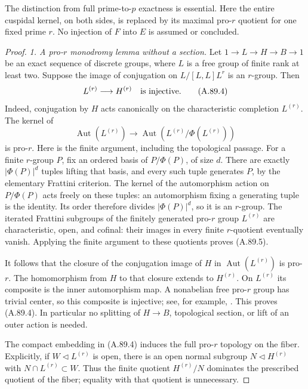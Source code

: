 \documentclass[11pt]{article}
\begin{document}
The distinction from full prime-to-\(p\) exactness is essential.
Here the entire cuspidal kernel, on both sides, is replaced by
its maximal pro-\(r\) quotient for one fixed prime \(r\).
No injection of \(F\) into \(E\) is assumed or concluded.

\begin{proof}
\emph{1. A pro-\(r\) monodromy lemma without a section.}
Let \(1\to L\to H\to B\to1\) be an exact sequence of
discrete groups, where \(L\) is a free group of finite rank
at least two. Suppose the image of conjugation on
\(L/[L,L]L^r\) is an \(r\)-group. Then
\[
                         L^{(r)}\longrightarrow H^{(r)}
                    \quad\hbox{is injective}.             \tag{A.89.4}
\]
Indeed, conjugation by \(H\) acts canonically on the
characteristic completion \(L^{(r)}\). The kernel of
\[
 \operatorname{Aut}(L^{(r)})\longrightarrow
 \operatorname{Aut}(L^{(r)}/\Phi(L^{(r)}))
                                                        \tag{A.89.5}
\]
is pro-\(r\). Here is the finite argument, including the
topological passage. For a finite \(r\)-group \(P\), fix
an ordered basis of \(P/\Phi(P)\), of size \(d\).
There are exactly \(|\Phi(P)|^d\) tuples lifting that basis,
and every such tuple generates \(P\), by the elementary
Frattini criterion. The kernel of the automorphism action
on \(P/\Phi(P)\) acts freely on these tuples: an
automorphism fixing a generating tuple is the identity.
Its order therefore divides \(|\Phi(P)|^d\), so it is an
\(r\)-group. The iterated Frattini subgroups of the
finitely generated pro-\(r\) group \(L^{(r)}\) are
characteristic, open, and cofinal: their images in every
finite \(r\)-quotient eventually vanish. Applying the
finite argument to these quotients proves (A.89.5).

It follows that the closure of the conjugation image of
\(H\) in \(\operatorname{Aut}(L^{(r)})\) is pro-\(r\).
The homomorphism from \(H\) to that closure extends to
\(H^{(r)}\). On \(L^{(r)}\) its composite is the inner
automorphism map. A nonabelian free pro-\(r\) group has
trivial center, so this composite is injective; see, for
example, \cite[Theorem~5.1, proof Case~I, and
Corollary~5.3]{FF_KochloukovaZalesskii2011}.
This proves (A.89.4). In particular no splitting of
\(H\to B\), topological section, or lift of an outer
action is needed.

The compact embedding in (A.89.4) induces the full
pro-\(r\) topology on the fiber. Explicitly, if
\(W\triangleleft L^{(r)}\) is open, there is an open
normal subgroup \(N\triangleleft H^{(r)}\) with
\(N\cap L^{(r)}\subset W\). Thus the finite quotient
\(H^{(r)}/N\) dominates the prescribed quotient of the
fiber; equality with that quotient is unnecessary.


\end{proof}
\end{document}
